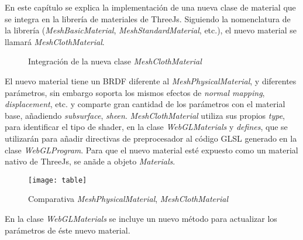 En este cap\'itulo se explica la implementaci\'on de una nueva clase de material que se integra en la librer\'ia de materiales
de ThreeJs. Siguiendo la nomenclatura de la librer\'ia (\textit{MeshBasicMaterial}, \textit{MeshStandardMaterial}, etc.), el
nuevo material se llamar\'a \textit{MeshClothMaterial}.




\begin{figure}[H]
  \centering
  \caption{Integraci\'on de la nueva clase \textit{MeshClothMaterial}}
\end{figure}
\singlespacing

El nuevo material tiene un BRDF diferente al \textit{MeshPhysicalMaterial},
y diferentes par\'ametros, sin embargo soporta los mismos efectos de \textit{normal mapping}, \textit{displacement}, etc.
y comparte gran cantidad de los par\'ametros con el material base, a\~nadiendo \textit{subsurface}, \textit{sheen}.
\textit{MeshClothMaterial} utiliza sus propios \textit{type}, para identificar el tipo de shader, en la clase \textit{WebGLMaterials}
y \textit{defines}, que se utilizar\'an para a\~nadir directivas de preprocesador al c\'odigo GLSL generado en la clase
\textit{WebGLProgram}. Para que el nuevo material est\'e expuesto como un material nativo de ThreeJs,
se an\~ade a objeto \textit{Materials}.

\begin{figure}[H]
  \vspace{0.5cm}
  \centering
    \texttt{[image: table]}
  \caption{Comparativa \textit{MeshPhysicalMaterial}, \textit{MeshClothMaterial}}
\end{figure}


En la clase \textit{WebGLMaterials} se incluye un nuevo m\'etodo para actualizar los par\'ametros de \'este nuevo material.\\


